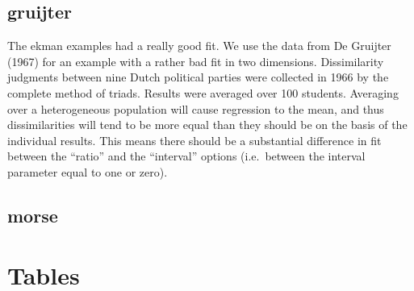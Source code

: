 \documentclass[
  12pt,
]{article}
\begin{document}
\subsection{gruijter}\label{gruijter}

The ekman examples had a really good fit. We use the data from De Gruijter (1967)
for an example with a rather bad fit in two dimensions.
Dissimilarity judgments between nine Dutch political parties were
collected in 1966 by the complete method of triads. Results were
averaged over 100 students. Averaging over a heterogeneous population
will cause regression to the mean, and thus dissimilarities will tend
to be more equal than they should be on the basis of the individual
results. This means there should be a substantial difference in fit between
the ``ratio'' and the ``interval'' options
(i.e.~between the interval parameter equal to one or zero).

\subsection{morse}\label{morse}

\section{Tables}\label{tables}
\end{document}
